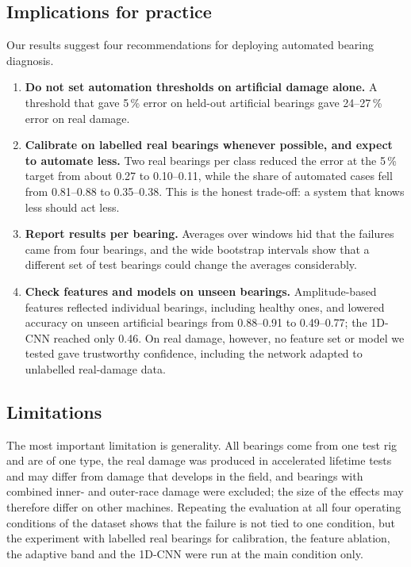 \subsection{Implications for practice}

Our results suggest four recommendations for deploying automated bearing diagnosis.
\begin{enumerate}[nosep]
  \item \textbf{Do not set automation thresholds on artificial damage alone.} A threshold that gave 5\,\% error on
        held-out artificial bearings gave 24--27\,\% error on real damage.
  \item \textbf{Calibrate on labelled real bearings whenever possible, and expect to automate less.} Two real bearings
        per class reduced the error at the 5\,\% target from about 0.27 to 0.10--0.11, while the share of automated
        cases fell from 0.81--0.88 to 0.35--0.38. This is the honest trade-off: a system that knows less should act
        less.
  \item \textbf{Report results per bearing.} Averages over windows hid that the failures came from four bearings, and
        the wide bootstrap intervals show that a different set of test bearings could change the averages
        considerably.
  \item \textbf{Check features and models on unseen bearings.} Amplitude-based features reflected individual
        bearings, including healthy ones, and lowered accuracy on unseen artificial bearings from 0.88--0.91 to
        0.49--0.77; the 1D-CNN reached only 0.46. On real damage, however, no feature set or model we tested gave
        trustworthy confidence, including the network adapted to unlabelled real-damage data.
\end{enumerate}

\subsection{Limitations}
\label{sec:limitations}

The most important limitation is generality. All bearings come from one test rig and are of one type, the real
damage was produced in accelerated lifetime tests and may differ from damage that develops in the field, and bearings
with combined inner- and outer-race damage were excluded; the size of the effects may therefore differ on other
machines. Repeating the evaluation at all four operating conditions of the dataset shows that the failure is not tied
to one condition, but the experiment with labelled real bearings for calibration, the feature ablation, the adaptive
band and the 1D-CNN were run at the main condition only.

